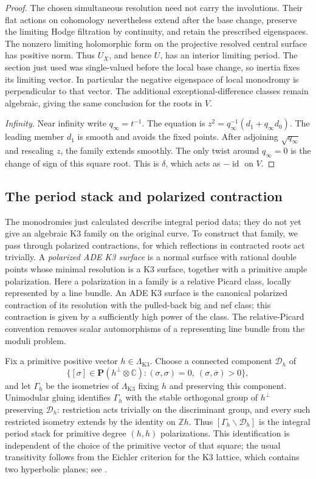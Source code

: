 \documentclass[11pt]{amsart}
\newcommand{\C}{\mathbb C}
\newcommand{\Z}{\mathbb Z}
\newcommand{\PP}{\mathbf P}
\DeclareMathOperator{\id}{id}
\theoremstyle{definition}
\theoremstyle{remark}
\numberwithin{equation}{section}
\begin{document}
\begin{proof}
The chosen simultaneous resolution need not carry the involutions.
Their flat actions on cohomology nevertheless extend after the base
change, preserve the limiting Hodge filtration by continuity, and
retain the prescribed eigenspaces.  The nonzero limiting holomorphic
form on the projective resolved central surface has positive norm.
Thus \(U_X\), and hence \(U\), has an interior limiting period.
The section just used was single-valued before the local base change,
so inertia fixes its limiting vector.  In particular the negative
eigenspace of local monodromy is perpendicular to that vector.  The
additional exceptional-difference classes remain algebraic, giving
the same conclusion for the roots in \(V\).


\emph{Infinity.}
Near infinity write \(q_\infty=t^{-1}\).  The equation is
\(z^2=q_\infty^{-1}(d_1+q_\infty d_0)\).
The leading member \(d_1\) is smooth and avoids the fixed points.
After adjoining \(\sqrt{q_\infty}\) and rescaling \(z\), the family
extends smoothly.  The only twist around \(q_\infty=0\) is the change
of sign of this square root.
This is \(\delta\), which acts as \(-\id\) on \(V\).
\end{proof}


\subsection{The period stack and polarized contraction}

The monodromies just calculated describe integral period data; they
do not yet give an algebraic K3 family on the original curve.  To
construct that family, we pass through polarized contractions, for
which reflections in contracted roots act trivially.  A
\emph{polarized ADE K3 surface} is a normal surface with rational double
points whose minimal resolution is a K3 surface, together with a
primitive ample polarization.  Here a polarization in a family is a
relative Picard class, locally represented by a line bundle.  An ADE K3
surface is the canonical polarized contraction of its resolution with
the pulled-back big and nef class; this contraction is given by a
sufficiently high power of the class.  The relative-Picard convention
removes scalar automorphisms of a representing line bundle from the
moduli problem.

Fix a primitive positive vector \(h\in\Lambda_{\mathrm{K3}}\).  Choose a connected
component \(\mathscr D_h\) of
\[
 \{[\sigma]\in\PP(h^\perp\otimes\C):
       (\sigma,\sigma)=0,\ (\sigma,\overline\sigma)>0\},
\]
and let \(\Gamma_h\) be the isometries of \(\Lambda_{\mathrm{K3}}\) fixing \(h\)
and preserving this component.  Unimodular gluing identifies \(\Gamma_h\)
with the stable orthogonal group of \(h^\perp\) preserving
\(\mathscr D_h\): restriction acts trivially on the discriminant group,
and every such restricted isometry extends by the identity on \(\Z h\).
Thus \([\Gamma_h\backslash\mathscr D_h]\) is the integral period stack
for primitive degree \((h,h)\) polarizations.  This identification is
independent of the choice of the primitive vector of that square; the
usual transitivity follows from the Eichler criterion for the K3
lattice, which contains two hyperbolic planes; see
\cite[Chapter~14, Corollary~1.10]{Huybrechts}.
\end{document}
